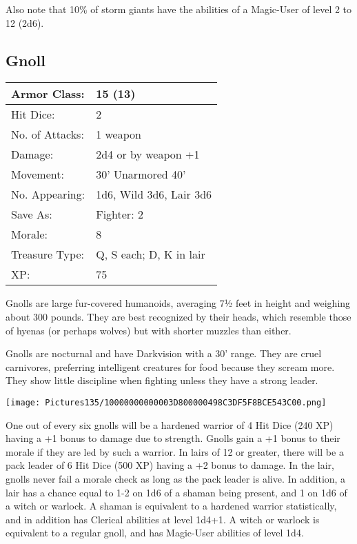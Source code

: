 \documentclass[a4paper,twoside,openany,10pt]{book}
\begin{document}
\begin{multicols}{2}
Also note that 10\% of storm giants have the abilities of a Magic-User of level 2 to 12 (2d6).


\subsection*{Gnoll}\label{gnoll}

\begin{tabularx}{0.48\textwidth}{@{}lX@{}}
Armor Class: & 15 (13) \\\hline
Hit Dice: & 2 \\\hline
No. of Attacks: & 1 weapon \\\hline
Damage: & 2d4 or by weapon +1 \\\hline
Movement: & 30' Unarmored 40' \\\hline
No. Appearing: & 1d6, Wild 3d6, Lair 3d6 \\\hline
Save As: & Fighter: 2 \\\hline
Morale: & 8 \\\hline
Treasure Type: & Q, S each; D, K in lair \\\hline
XP: & 75 \\\hline
\end{tabularx}\medskip

Gnolls are large fur-covered humanoids, averaging 7½ feet in height and weighing about 300 pounds. They are best recognized by their heads, which resemble those of hyenas (or perhaps wolves) but with shorter muzzles than either.

Gnolls are nocturnal and have Darkvision with a 30' range. They are cruel carnivores, preferring intelligent creatures for food because they scream more. They show little discipline when fighting unless they have a strong leader.


\begin{center}
	\texttt{[image: Pictures135/10000000000003D800000498C3DF5F8BCE543C00.png]}
\end{center}


One out of every six gnolls will be a hardened warrior of 4 Hit Dice (240 XP) having a +1 bonus to damage due to strength. Gnolls gain a +1 bonus to their morale if they are led by such a warrior. In lairs of 12 or greater, there will be a pack leader of 6 Hit Dice (500 XP) having a +2 bonus to damage. In the lair, gnolls never fail a morale check as long as the pack leader is alive. In addition, a lair has a chance equal to 1-2 on 1d6 of a shaman being present, and 1 on 1d6 of a witch or warlock. A shaman is equivalent to a hardened warrior statistically, and in addition has Clerical abilities at level 1d4+1. A witch or warlock is equivalent to a regular gnoll, and has Magic-User abilities of level 1d4.


\end{multicols}
\end{document}
